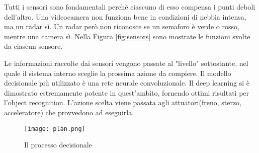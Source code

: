Tutti i sensori sono fondamentali perchè ciascuno di esso compensa i punti deboli dell'altro. Una videocamera non funziona bene in condizioni di nebbia intensa, ma un radar sì. Un radar però non riconosce se
un semaforo è verde o rosso, mentre una camera sì. Nella Figura \ref{fig:sensors} sono mostrate le funzioni svolte da ciascun sensore.


Le informazioni raccolte dai sensori vengono passate al "livello" sottostante, nel quale il sistema interno sceglie la prossima azione da compiere.
Il modello decisionale più utilizzato è una rete neurale convoluzionale. Il deep learning si è dimostrato estremamente potente in quest'ambito, fornendo
ottimi risultati per l'object recognition. L'azione scelta viene passata agli attuatori(freno, sterzo, acceleratore) che provvedono ad eseguirla.
\begin{figure}[h]
    \texttt{[image: plan.png]}
    \caption{Il processo decisionale\cite{giacaglia}}
    \label{fig:giacaglia}
\end{figure}